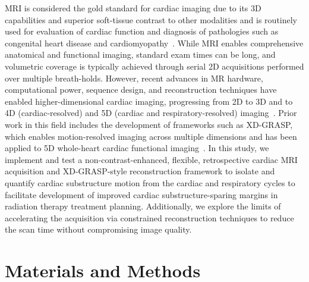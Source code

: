 MRI is considered the gold standard for cardiac imaging due to its 3D capabilities and superior soft-tissue contrast to other modalities and is routinely used for evaluation of cardiac function and diagnosis of pathologies such as congenital heart disease and cardiomyopathy~\cite{zhuFreeBreathing3DImaging2015,rajiahCardiacMRIState2023}.  While MRI enables comprehensive anatomical and functional imaging, standard exam times can be long, and volumetric coverage is typically achieved through serial 2D acquisitions performed over multiple breath-holds. However, recent advances in MR hardware, computational power, sequence design, and reconstruction techniques have enabled higher-dimensional cardiac imaging, progressing from 2D to 3D and to 4D (cardiac-resolved) and 5D (cardiac and respiratory-resolved) imaging~\cite{subashiViewsharing4DMagnetic2023,tryggestadRespirationbasedSortingDynamic2013,curtisPrimerHistoricalReview2022,feng5DWholeheartSparse2018, ogierFreerunning5DWholeheart2025}. Prior work in this field includes the development of frameworks such as XD-GRASP, which enables motion-resolved imaging across multiple dimensions and has been applied to 5D whole-heart cardiac functional imaging~\cite{fengXDGRASPGoldenangleRadial2016}. In this study, we implement and test a non-contrast-enhanced, flexible, retrospective cardiac MRI acquisition and XD-GRASP-style reconstruction framework to isolate and quantify cardiac substructure motion from the cardiac and respiratory cycles to facilitate development of improved cardiac substructure-sparing margins in radiation therapy treatment planning. Additionally, we explore the limits of accelerating the acquisition via constrained reconstruction techniques to reduce the scan time without compromising image quality. 


\section{Materials and Methods}

